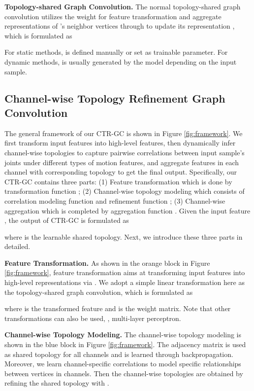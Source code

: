 \documentclass[10pt,twocolumn,letterpaper]{article}
\begin{document}
\noindent \textbf{Topology-shared Graph Convolution.} The normal topology-shared graph convolution utilizes the weight  for feature transformation and aggregate representations of 's neighbor vertices through  to update its representation , which is formulated as
\vspace{-0.2cm}


For static methods,  is defined manually or set as trainable parameter. For dynamic methods,  is usually generated by the model depending on the input sample. 

\subsection{Channel-wise Topology Refinement Graph Convolution}



The general framework of our CTR-GC is shown in Figure \ref{fig:framework}. We first transform input features into high-level features, then dynamically infer channel-wise topologies to capture pairwise correlations between input sample's joints under different types of motion features, and aggregate features in each channel with corresponding topology to get the final output. Specifically, our CTR-GC contains three parts: (1) Feature transformation which is done by transformation function ; (2) Channel-wise topology modeling which consists of correlation modeling function  and refinement function ; (3) Channel-wise aggregation which is completed by aggregation function . Given the input feature , the output  of CTR-GC is formulated as
\vspace{-0.2cm}

where  is the learnable shared topology. Next, we introduce these three parts in detailed.







\noindent \textbf{Feature Transformation.} As shown in the orange block in Figure \ref{fig:framework}, feature transformation aims at transforming input features into high-level representations via . We adopt a simple linear transformation here as the topology-shared graph convolution, which is formulated as
\vspace{-0.2cm}
 
where  is the transformed feature and  is the weight matrix. Note that other transformations can also be used, \eg, multi-layer perceptron.

\noindent \textbf{Channel-wise Topology Modeling.} The channel-wise topology modeling is shown in the blue block in Figure \ref{fig:framework}. The adjacency matrix is used as shared topology for all channels and is learned through backpropagation. Moreover, we learn channel-specific correlations  to model specific relationships between vertices in  channels. Then the channel-wise topologies  are obtained by refining the shared topology  with .
\end{document}
